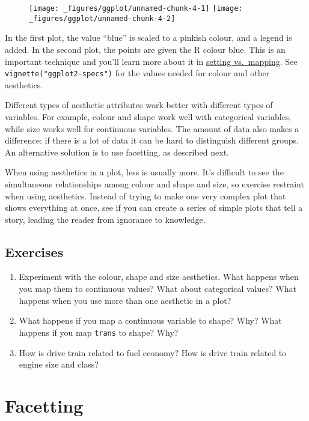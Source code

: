 \begin{figure}[H]
  \texttt{[image: \_figures/ggplot/unnamed-chunk-4-1]}%
  \texttt{[image: \_figures/ggplot/unnamed-chunk-4-2]}
\end{figure}

In the first plot, the value ``blue'' is scaled to a pinkish colour, and
a legend is added. In the second plot, the points are given the R colour
blue. This is an important technique and you'll learn more about it in
\protect\hyperlink{sub:setting-mapping}{setting vs.~mapping}. See
\texttt{vignette("ggplot2-specs")} for the values needed for colour and
other aesthetics.

Different types of aesthetic attributes work better with different types
of variables. For example, colour and shape work well with categorical
variables, while size works well for continuous variables. The amount of
data also makes a difference: if there is a lot of data it can be hard
to distinguish different groups. An alternative solution is to use
facetting, as described next.

When using aesthetics in a plot, less is usually more. It's difficult to
see the simultaneous relationships among colour and shape and size, so
exercise restraint when using aesthetics. Instead of trying to make one
very complex plot that shows everything at once, see if you can create a
series of simple plots that tell a story, leading the reader from
ignorance to knowledge.

\hypertarget{exercises-2}{%
\subsection{Exercises}\label{exercises-2}}

\begin{enumerate}
\def\labelenumi{\arabic{enumi}.}
\item
  Experiment with the colour, shape and size aesthetics. What happens
  when you map them to continuous values? What about categorical values?
  What happens when you use more than one aesthetic in a plot?
\item
  What happens if you map a continuous variable to shape? Why? What
  happens if you map \texttt{trans} to shape? Why?
\item
  How is drive train related to fuel economy? How is drive train related
  to engine size and class?
\end{enumerate}

\hypertarget{sec:qplot-facetting}{%
\section{Facetting}\label{sec:qplot-facetting}}

